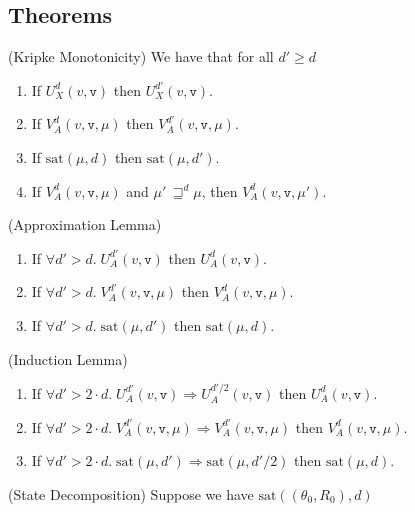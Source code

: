 \documentclass[preprint]{sigplanconf}
\newcommand{\betterstate}[3]{{#2}\, {\sqsupseteq}^{#1} {#3}}
\renewcommand{\implies}{\Rightarrow}
\newcommand{\term}[1]{\ensuremath{\mathtt{{#1}}}}
\newcommand{\satisfy}[2]{\mathrm{sat}({#1},{#2})}
\begin{document}
\subsection{Theorems}

\begin{prop}{(Kripke Monotonicity)}
We have that for all $d' \geq d$
\begin{enumerate}
\item If $U^d_X(v, \term{v})$ then $U^{d'}_X(v, \term{v})$. 
\item If $V^d_A(v, \term{v}, \mu)$ then $V^{d'}_A(v, \term{v}, \mu)$. 
\item If $\satisfy{\mu}{d}$ then $\satisfy{\mu}{d'}$. 
\item If $V^d_A(v, \term{v}, \mu)$ and $\betterstate{d}{\mu'}{\mu}$, then $V^d_A(v, \term{v}, \mu')$.
\end{enumerate}
\end{prop}

\begin{lemma}{(Approximation Lemma)}
\begin{enumerate}
  \item If $\forall d' > d.\; U^{d'}_A(v, \term{v})$ then $U^d_A(v, \term{v})$. 
  \item If $\forall d' > d.\; V^{d'}_A(v, \term{v}, \mu)$ then $V^d_A(v, \term{v}, \mu)$. 
  \item If $\forall d' > d.\; \satisfy{\mu}{d'}$ then $\satisfy{\mu}{d}$. 
\end{enumerate}
\end{lemma}

\begin{lemma}{(Induction Lemma)}
\begin{enumerate}
  \item If $\forall d' > 2\cdot d.\; U^{d'}_A(v, \term{v}) \implies U^{d'/2}_A(v, \term{v})$ then $U^d_A(v, \term{v})$. 
  \item If $\forall d' > 2\cdot d.\; V^{d'}_A(v, \term{v}, \mu) \implies V^{d'}_A(v, \term{v}, \mu)$ then $V^d_A(v, \term{v}, \mu)$. 
  \item If $\forall d' > 2\cdot d.\; \satisfy{\mu}{d'} \implies \satisfy{\mu}{d'/2}$ then $\satisfy{\mu}{d}$. 
\end{enumerate}
\end{lemma}

\begin{lemma}{(State Decomposition)}
Suppose we have $\satisfy{(\theta_0, R_0)}{d}$ 
  
\end{lemma}
\end{document}
